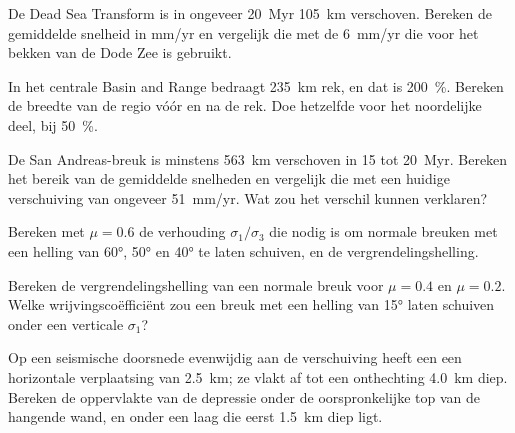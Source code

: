 \begin{exercise}[$\star$]\label{exo:b3:extension-strike-slip:3}
De Dead Sea Transform is in ongeveer \qty{20}{Myr} \qty{105}{km} verschoven.
Bereken de gemiddelde snelheid in \unit{mm/yr} en vergelijk die met de \qty{6}{mm/yr}
die voor het bekken van de Dode Zee is gebruikt.
\end{exercise}

\begin{exercise}[$\star$]\label{exo:b3:extension-strike-slip:4}
In het centrale Basin and Range bedraagt \qty{235}{km} rek, en dat is
\qty{200}{\percent}. Bereken de breedte van de regio vóór en na de rek. Doe hetzelfde
voor het noordelijke deel, bij \qty{50}{\percent}.
\end{exercise}

\begin{exercise}[$\star\star$]\label{exo:b3:extension-strike-slip:5}
De San Andreas-breuk is minstens \qty{563}{km} verschoven in 15 tot
\qty{20}{Myr}. Bereken het bereik van de gemiddelde snelheden en vergelijk die
met een huidige verschuiving van ongeveer \qty{51}{mm/yr}. Wat zou het verschil kunnen verklaren?
\end{exercise}

\begin{exercise}[$\star\star$]\label{exo:b3:extension-strike-slip:6}
Bereken met $\mu = 0.6$ de verhouding $\sigma_1/\sigma_3$ die nodig is om normale breuken
met een helling van \ang{60}, \ang{50} en \ang{40} te laten schuiven, en de vergrendelingshelling.
\end{exercise}

\begin{exercise}[$\star\star$]\label{exo:b3:extension-strike-slip:7}
Bereken de vergrendelingshelling van een normale breuk voor $\mu = 0.4$ en $\mu = 0.2$.
Welke wrijvingscoëfficiënt zou een breuk met een helling van \ang{15} laten schuiven
onder een verticale $\sigma_1$?
\end{exercise}

\begin{exercise}[$\star\star$]\label{exo:b3:extension-strike-slip:8}
Op een seismische doorsnede evenwijdig aan de verschuiving heeft een  een
horizontale verplaatsing van \qty{2.5}{km}; ze vlakt af tot een onthechting \qty{4.0}{km} diep.
Bereken de oppervlakte van de depressie onder de oorspronkelijke top van de hangende wand,
en onder een laag die eerst \qty{1.5}{km} diep ligt.
\end{exercise}

